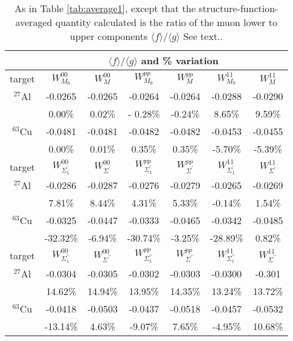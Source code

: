 \documentclass{book}[12pt]
\begin{document}
\begin{table}
\centering
 \begin{tabular}{|c|c|c|c|c|c|c|}
 \hline
 \rule{0cm}{0.4cm}
 &  \multicolumn{5}{c}{~~~~~~~${\langle f \rangle/ \langle g \rangle}$ and \% variation}  &\\[0.15cm]
\hline
\rule{0cm}{0.4cm}
 target & $W_{M_0}^{00}$ & $W_M^{00}$ & $W_{M_0}^{pp}$ & $W_M^{pp}$ & $W_{M_0}^{11}$ & $W_M^{11}$ \\[0.15cm]
 \hline
 \rule{0cm}{0.4cm}
 $^{27}$Al &-0.0265 &-0.0265 &-0.0264 &-0.0264 &-0.0288 & -0.0290 \\
  & 0.00\% & 0.02\% &- 0.28\% & -0.24\% & 8.65\% & 9.59\% \\
 \rule{0cm}{0.4cm}
  $^{63}$Cu & -0.0481 & -0.0481 & -0.0482 & -0.0482 & -0.0453 & -0.0455 \\
  & 0.00\% & 0.01\% & 0.35\% & 0.35\% & -5.70\% & -5.39\% \\ [.15cm]
 \hline
\rule{0cm}{0.5cm}
 target & $W_{\Sigma^\prime_1}^{00}$ & $W_{\Sigma^\prime}^{00}$ & $W_{\Sigma^\prime_1}^{pp}$ & $W_{\Sigma^\prime}^{pp}$ & $W_{\Sigma^\prime_1}^{11}$ & $W_{\Sigma^\prime}^{11}$ \\[0.15cm]
 \hline
 \rule{0cm}{0.4cm}
 $^{27}$Al & -0.0286 & -0.0287 & -0.0276 & -0.0279 & -0.0265 & -0.0269  \\
  & 7.81\% & 8.44\% & 4.31\% & 5.33\% & -0.14\% & 1.54\% \\
 \rule{0cm}{0.4cm}
  $^{63}$Cu & -0.0325 & -0.0447 & -0.0333 & -0.0465 & -0.0342 & -0.0485 \\
  & -32.32\% & -6.94\% & -30.74\% & -3.25\% & -28.89\% & 0.82\% \\ [.15cm]
  \hline
\rule{0cm}{0.5cm}
 target & $W_{\Sigma^{\prime \prime}_1}^{00}$ & $W_{\Sigma^{\prime \prime}}^{00}$ & $W_{\Sigma^{\prime \prime}_1}^{pp}$ & $W_{\Sigma^{\prime \prime}}^{pp}$ & $W_{\Sigma^{\prime \prime}_1}^{11}$ & $W_{\Sigma^{\prime \prime}}^{11}$ \\[0.15cm]
 \hline
 \rule{0cm}{0.4cm}
 $^{27}$Al & -0.0304 & -0.0305 & -0.0302 & -0.0303 &  -0.0300 &  -0.301 \\
  & 14.62\% & 14.94\% & 13.95\% & 14.35\% & 13.24\% & 13.72\% \\
 \rule{0cm}{0.4cm}
  $^{63}$Cu & -0.0418 & -0.0503 & -0.0437 & -0.0518 & -0.0457 &  -0.0532 \\
  & -13.14\% & 4.63\% & -9.07\% & 7.65\% &  -4.95\% & 10.68\% \\ [.15cm]
  \hline
 \end{tabular}
  \caption{ \label{tab:average2} As in Table \ref{tab:average1}, except that the structure-function-averaged quantity calculated is the ratio of the muon lower to upper components $\langle f \rangle/\langle g \rangle$  See text..}
\end{table}
\end{document}
